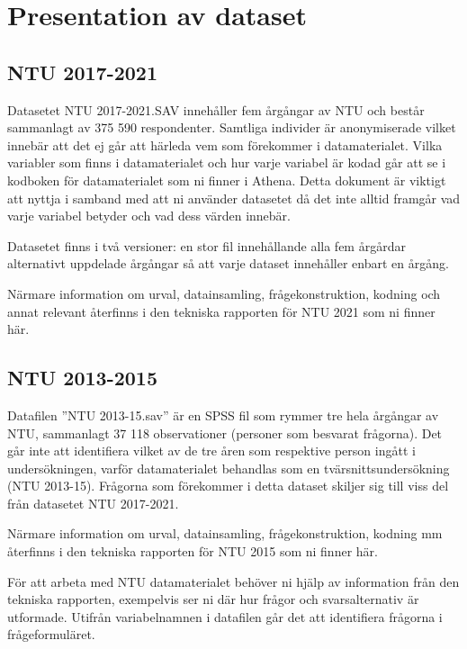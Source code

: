 \documentclass[
]{book}
\begin{document}
\hypertarget{presentation-av-dataset}{%
\chapter{Presentation av dataset}\label{presentation-av-dataset}}

\hypertarget{ntu-2017-2021}{%
\section{NTU 2017-2021}\label{ntu-2017-2021}}

Datasetet NTU 2017-2021.SAV innehåller fem årgångar av NTU och består sammanlagt av 375 590 respondenter. Samtliga individer är anonymiserade vilket innebär att det ej går att härleda vem som förekommer i datamaterialet. Vilka variabler som finns i datamaterialet och hur varje variabel är kodad går att se i kodboken för datamaterialet som ni finner i Athena. Detta dokument är viktigt att nyttja i samband med att ni använder datasetet då det inte alltid framgår vad varje variabel betyder och vad dess värden innebär.

Datasetet finns i två versioner: en stor fil innehållande alla fem årgårdar alternativt uppdelade årgångar så att varje dataset innehåller enbart en årgång.

Närmare information om urval, datainsamling, frågekonstruktion, kodning och annat relevant återfinns i den
tekniska rapporten för NTU 2021 som ni finner här.

\hypertarget{ntu-2013-2015}{%
\section{NTU 2013-2015}\label{ntu-2013-2015}}

Datafilen ''NTU 2013-15.sav'' är en SPSS fil som rymmer tre hela årgångar av NTU,
sammanlagt 37 118 observationer (personer som besvarat frågorna). Det går inte att identifiera
vilket av de tre åren som respektive person ingått i undersökningen, varför datamaterialet
behandlas som en tvärsnittsundersökning (NTU 2013-15). Frågorna som förekommer i detta dataset skiljer sig till viss del från datasetet NTU 2017-2021.

Närmare information om urval, datainsamling, frågekonstruktion, kodning mm återfinns i den
tekniska rapporten för NTU 2015 som ni finner här.

För att arbeta med NTU datamaterialet behöver ni hjälp av information från den tekniska
rapporten, exempelvis ser ni där hur frågor och svarsalternativ är utformade.
Utifrån variabelnamnen i datafilen går det att identifiera frågorna i frågeformuläret.
\end{document}
